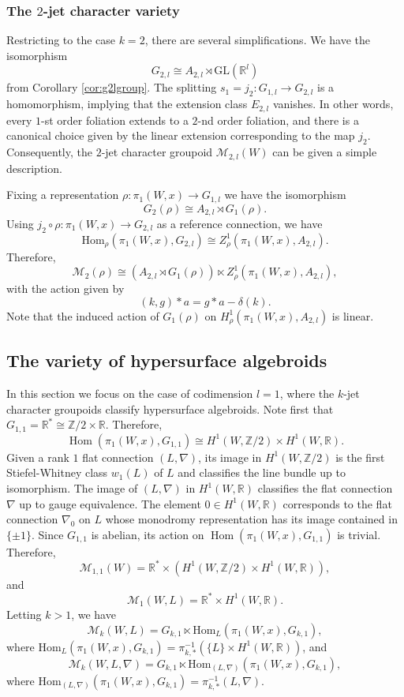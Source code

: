 \documentclass[10pt]{amsart}
\newcommand{\Hom}{\operatorname{Hom}}
\numberwithin{theoremalpha}{section}
\numberwithin{equation}{section}
\numberwithin{definition}{section}
\numberwithin{theorem}{section}
\numberwithin{proposition}{section}
\numberwithin{lemma}{section}
\numberwithin{example}{section}
\numberwithin{remark}{section}
\numberwithin{corollary}{section}
\numberwithin{question}{section}
\numberwithin{problem}{section}
\numberwithin{assumption}{section}
\theoremstyle{named}
\numberwithin{equation}{section}
\begin{document}
\subsubsection{The $2$-jet character variety}
Restricting to the case $k = 2$, there are several simplifications. We have the isomorphism 
\[
G_{2,l} \cong A_{2,l} \rtimes \mathrm{GL}(\mathbb{R}^l)
\]
from Corollary \ref{cor:g2lgroup}. The splitting $s_{1} = j_{2}: G_{1,l} \to G_{2,l}$ is a homomorphism, implying that the extension class $E_{2,l}$ vanishes. In other words, every $1$-st order foliation extends to a $2$-nd order foliation, and there is a canonical choice given by the linear extension corresponding to the map $j_2$. Consequently, the $2$-jet character groupoid $\mathcal{M}_{2,l}(W)$ can be given a simple description.  

Fixing a representation $\rho : \pi_{1}(W, x) \to G_{1, l}$ we have the isomorphism 
\[
G_{2}(\rho) \cong A_{2,l} \rtimes G_{1}(\rho).
\]
Using $j_{2} \circ \rho : \pi_{1}(W, x) \to G_{2,l}$ as a reference connection, we have 
\[
 \mathrm{Hom}_{\rho}(\pi_{1}(W,x), G_{2,l}) \cong Z_{\rho}^{1}(\pi_{1}(W,x), A_{2, l}). 
\]
Therefore, 
\[
\mathcal{M}_{2}(\rho) \cong (A_{2,l} \rtimes G_{1}(\rho)) \ltimes Z_{\rho}^{1}(\pi_{1}(W,x), A_{2, l}),
\]
with the action given by 
\[
(k, g) \ast a = g \ast a - \delta(k). 
\]
Note that the induced action of $G_{1}(\rho)$ on $H_{\rho}^{1}(\pi_{1}(W,x), A_{2, l})$ is linear. 
\subsection{The variety of hypersurface algebroids}
In this section we focus on the case of codimension $l = 1$, where the $k$-jet character groupoids classify hypersurface algebroids. Note first that $G_{1,1} = \mathbb{R}^{*} \cong \mathbb{Z}/2 \times \mathbb{R}$. Therefore, 
\[
\Hom(\pi_1(W, x), G_{1,1}) \cong H^{1}(W, \mathbb{Z}/2) \times H^{1}(W, \mathbb{R}). 
\]
Given a rank $1$ flat connection $(L, \nabla)$, its image in $H^{1}(W, \mathbb{Z}/2)$ is the first Stiefel-Whitney class $w_{1}(L)$ of $L$ and classifies the line bundle up to isomorphism. The image of $(L, \nabla)$ in $H^{1}(W, \mathbb{R})$ classifies the flat connection $\nabla$ up to gauge equivalence. The element $0 \in H^{1}(W, \mathbb{R})$ corresponds to the flat connection $\nabla_{0}$ on $L$ whose monodromy representation has its image contained in $\{ \pm 1 \}$. Since $G_{1,1}$ is abelian, its action on $\Hom(\pi_1(W, x), G_{1,1})$ is trivial. Therefore, 
\[
\mathcal{M}_{1,1}(W) = \mathbb{R}^* \times (H^{1}(W, \mathbb{Z}/2) \times H^{1}(W, \mathbb{R})),
\]
and 
\[
\mathcal{M}_{1}(W, L) = \mathbb{R}^* \times H^{1}(W, \mathbb{R}). 
\]
Letting $k > 1$, we have 
\[
\mathcal{M}_{k}(W, L) = G_{k,1} \ltimes \mathrm{Hom}_{L}(\pi_{1}(W,x), G_{k,1}),
\]
where $\mathrm{Hom}_{L}(\pi_{1}(W,x), G_{k,1}) = \pi_{k, *}^{-1}( \{ L \} \times H^{1}(W, \mathbb{R}))$, and 
\[
\mathcal{M}_{k}(W, L, \nabla) = G_{k,1} \ltimes \mathrm{Hom}_{(L, \nabla)}(\pi_{1}(W,x), G_{k,1}),
\]
where $\mathrm{Hom}_{(L,\nabla)}(\pi_{1}(W,x), G_{k,1}) = \pi_{k, *}^{-1}(L, \nabla) $. 
\end{document}
